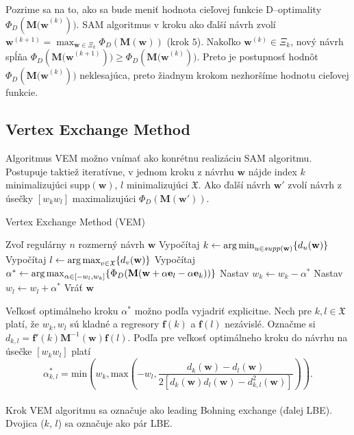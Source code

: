 Pozrime sa na to, ako sa bude meniť hodnota cieľovej funkcie D--optimality $\Phi_D(\mathbf{M(w}^{(k)}))$. SAM algoritmus v kroku ako ďalší návrh zvolí $\mathbf w^{(k+1)} = \max_{\mathbf w \in \Xi_k} \Phi_D(\mathbf{M(w)})$ (krok $5$).
Nakoľko $\mathbf w^{(k)} \in \Xi_k$, nový návrh spĺňa $\Phi_D(\mathbf {M(w}^{(k+1)})) \geq \Phi_D(\mathbf{M(w}^{(k)}))$. Preto je postupnosť hodnôt $\Phi_D(\mathbf{M(w}^{(k)}))$ neklesajúca, preto žiadnym krokom nezhoršíme hodnotu cieľovej funkcie.

\subsection{Vertex Exchange Method}

Algoritmus VEM možno vnímať ako konrétnu realizáciu SAM algoritmu. Postupuje taktiež iteratívne, v jednom kroku z návrhu $\mathbf w$ nájde index $k$ minimalizujúci supp$(\mathbf w)$, $l$ minimalizujúci $\mathfrak X$. Ako ďalší návrh $\mathbf {w'}$ zvolí návrh z úsečky $[w_kw_l]$ maximalizujúci $\Phi_D(\mathbf {M(w')})$.

\begin{algorithm}[H]
	\caption{Vertex Exchange Method (VEM) \cite{rex_harman}}
	\label{vem}
	\begin{algorithmic}[1]
		\State Zvoľ regulárny $n$ rozmerný návrh $\mathbf w$
			\State Vypočítaj $k \leftarrow \operatorname*{arg\,min}_{u \in supp(\mathbf w)} \{ d_u(\mathbf w)\}$
			\State Vypočítaj $l \leftarrow \operatorname*{arg\,max}_{v \in \mathfrak X} \{ d_v(\mathbf w)\}$
			\State Vypočítaj $\alpha^* \leftarrow \operatorname*{arg\,max}_{\alpha \in [-w_l, w_k]} \{ \Phi_D (\mathbf M(\mathbf w+\alpha \mathbf e_l -\alpha \mathbf e_k))\}$
			\State Nastav $w_k \leftarrow w_k - \alpha^*$
			\State Nastav $w_l \leftarrow w_l + \alpha^*$
		\EndWhile
		\State Vráť $\mathbf w$
	\end{algorithmic}
\end{algorithm}

Veľkosť optimálneho kroku $\alpha^*$  možno podľa \cite{rex_harman} vyjadriť explicitne. Nech pre $k, l \in \mathfrak X$ platí, že $w_k, w_l$ sú kladné a regresory $\mathbf f(k)$ a $\mathbf f(l)$ nezávislé. Označme si $d_{k,l}=\mathbf {f'}(k) \mathbf M^{-1}\mathbf{(w)f}(l)$. Podľa \cite{rex_harman} pre veľkosť optimálneho kroku do návrhu na úsečke $[w_kw_l]$ platí $$\alpha_{k,l}^*=\text{min} \left( w_k, \text{max} \left(-w_l, \frac{d_k(\mathbf w)-d_l(\mathbf w)}{2[d_k(\mathbf w)d_l(\mathbf w)-d_{k,l}^2(\mathbf w)]} \right) \right).$$\\

Krok VEM algoritmu sa označuje ako leading Bohning exchange (ďalej LBE). Dvojica ($k$, $l$) sa označuje ako pár LBE.